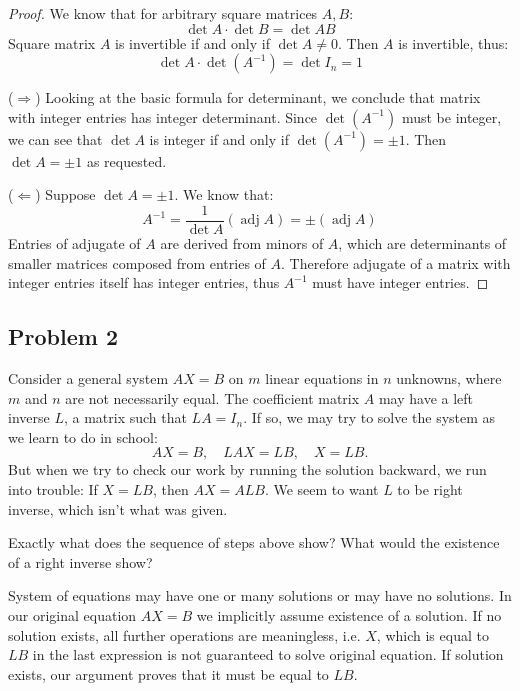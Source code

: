 \documentclass{article}
\DeclareMathOperator{\adj}{\operatorname{adj}}
\begin{document}
\begin{proof}

We know that for arbitrary square matrices $A,B$:
\[ \det A \cdot \det B = \det AB \]
Square matrix $A$ is invertible if and only if $\det A \neq 0$.
Then $A$ is invertible, thus:
\[ \det A \cdot \det (A^{-1}) = \det I_n = 1 \]

($\Rightarrow$)
Looking at the basic formula for determinant, we conclude that matrix with integer entries has integer determinant.
Since $\det (A^{-1})$ must be integer, we can see that $\det A$ is integer if and only if $\det (A^{-1}) = \pm 1$.
Then $\det A = \pm 1$ as requested.

($\Leftarrow$)
Suppose $\det A = \pm 1$. We know that:
\[ A^{-1} = \frac{1}{\det A} (\adj A) = \pm (\adj A) \]
Entries of adjugate of $A$ are derived from minors of $A$, which are determinants of smaller matrices composed from entries of $A$.
Therefore adjugate of a matrix with integer entries itself has integer entries, thus $A^{-1}$ must have integer entries.

\end{proof}


\subsection*{Problem 2}

\begin{tcolorbox}
Consider a general system $AX = B$ on $m$ linear equations in $n$ unknowns, where $m$ and $n$ are not necessarily equal.
The coefficient matrix $A$ may have a left inverse $L$, a matrix such that $LA=I_n$.
If so, we may try to solve the system as we learn to do in school:
\[ AX=B, \quad LAX=LB, \quad X=LB. \]
But when we try to check our work by running the solution backward, we run into trouble:
If $X=LB$, then $AX=ALB$.
We seem to want $L$ to be right inverse, which isn't what was given.

Exactly what does the sequence of steps above show?
What would the existence of a right inverse show?
\end{tcolorbox}

System of equations may have one or many solutions or may have no solutions.
In our original equation $AX=B$ we implicitly assume existence of a solution.
If no solution exists, all further operations are meaningless, i.e. $X$, which is equal to $LB$ in the last expression is not guaranteed to solve original equation.
If solution exists, our argument proves that it must be equal to $LB$.
\end{document}
